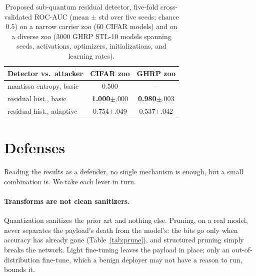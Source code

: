 \documentclass[a4paper,fleqn]{cas-dc}
\theoremstyle{plain}
\theoremstyle{remark}
\begin{document}
\begin{table}[!tb]\centering
\caption{Proposed sub-quantum residual detector, five-fold cross-validated ROC-AUC
(mean $\pm$ std over five seeds; chance $0.5$) on a narrow carrier zoo ($60$ CIFAR models)
and on a diverse zoo ($3000$ GHRP STL-10 models spanning seeds, activations, optimizers,
initializations, and learning rates).}
\label{tab:detector}
\small
\begin{tabular*}{\columnwidth}{@{\extracolsep{\fill}}lcc@{}}
\toprule
Detector vs.\ attacker & CIFAR zoo & GHRP zoo\\
\midrule
mantissa entropy, basic & 0.500 & ---\\
residual hist., basic & \textbf{1.000}{\scriptsize$\pm$.000} & \textbf{0.980}{\scriptsize$\pm$.003}\\
residual hist., adaptive & 0.754{\scriptsize$\pm$.049} & 0.537{\scriptsize$\pm$.042}\\
\bottomrule
\end{tabular*}
\end{table}

\section{Defenses}\label{sec:defenses}
Reading the results as a defender, no single mechanism is enough, but a small
combination is. We take each lever in turn.

\paragraph{Transforms are not clean sanitizers.} Quantization sanitizes the prior art
and nothing else. Pruning, on a real model, never separates the payload's death from
the model's: the bits go only when accuracy has already gone (Table~\ref{tab:prune}),
and structured pruning simply breaks the network. Light fine-tuning leaves the payload
in place; only an out-of-distribution fine-tune, which a benign deployer may not have a
reason to run, bounds it.
\end{document}
